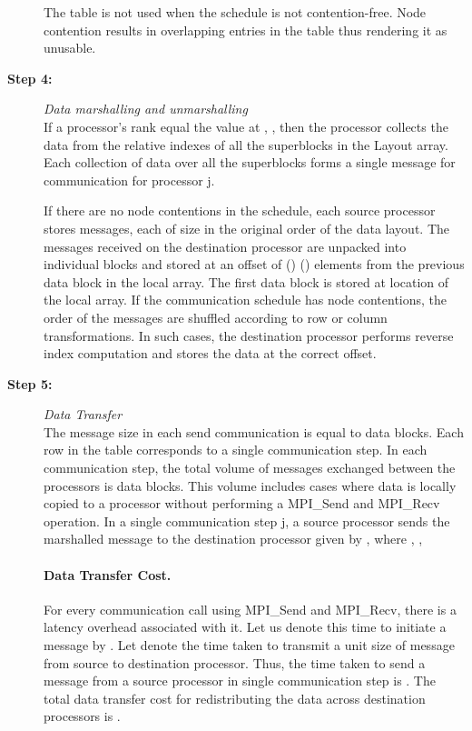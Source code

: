 \documentclass[letterpaper]{llncs}
\begin{document}
\begin{description}
The  table is not used when the schedule is not contention-free. Node contention results in  overlapping entries in the  table 
thus rendering it as unusable.

\item[\textbf{Step 4:}] \hspace{0.05in}\textit{Data marshalling and unmarshalling}\\
If a processor's rank equal the value at , , then  
the processor collects the data from the relative indexes of all the superblocks in the Layout array. Each collection of data
over all the superblocks forms a single message for communication for processor j.

If there are no node contentions in the schedule, each source processor stores 
 messages, each of size  in the original order of the data layout.
The messages received on the destination processor are unpacked into individual blocks
 and stored 
at an offset of ()  () elements from the previous data block 
in the local array. The first data block is stored at  location of the 
local array.
If the communication schedule has  node contentions, the order of the messages are shuffled according to row or column transformations. In such cases, the destination processor performs reverse index computation and stores the data at the correct offset.


\item[\textbf{Step 5:}] \hspace{0.05in}\textit{Data Transfer}\\
The message size in each send communication is equal to  data blocks.
Each row in the  table corresponds to  a single communication step. 
In each communication step, the total volume of messages exchanged between the processors is  data blocks. 
This volume includes cases where data is locally copied to a processor without performing a MPI\_Send and MPI\_Recv operation.
 In a single communication step j, a source processor  sends the marshalled  
message to the destination processor given by , where  , , 
 
\paragraph*{Data Transfer Cost. }
For every communication call using MPI\_Send and MPI\_Recv, there is a latency overhead associated with it. Let us denote this time to initiate a message by . 
Let  denote the time taken to transmit a unit size of message from source to destination processor. Thus, the time taken to send a message from a source processor
in single communication step is . The total data transfer cost for redistributing the data across destination processors is
.
\end{description}
\end{document}
